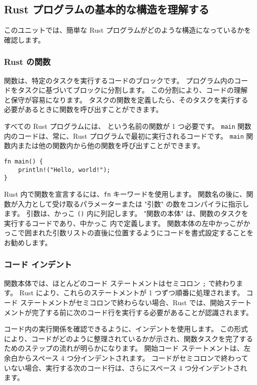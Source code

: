 \subsection{Rust プログラムの基本的な構造を理解する}

このユニットでは、簡単な Rust プログラムがどのような構造になっているかを確認します。

\subsubsection{Rust の関数}

関数は、特定のタスクを実行するコードのブロックです。 プログラム内のコードをタスクに基づいてブロックに分割します。 この分割により、コードの理解と保守が容易になります。 タスクの関数を定義したら、そのタスクを実行する必要があるときに関数を呼び出すことができます。

すべての Rust プログラムには、 という名前の関数が 1 つ必要です。 \texttt{main} 関数内のコードは、常に、Rust プログラムで最初に実行されるコードです。 \texttt{main} 関数内または他の関数内から他の関数を呼び出すことができます。



\begin{lstlisting}[numbers=none]
fn main() {
    println!("Hello, world!");
}
\end{lstlisting}

Rust 内で関数を宣言するには、\texttt{fn} キーワードを使用します。 関数名の後に、関数が入力として受け取るパラメーターまたは "引数" の数をコンパイラに指示します。 引数は、かっこ \texttt{()} 内に列記します。 "関数の本体" は、関数のタスクを実行するコードであり、中かっこ 内で定義します。 関数本体の左中かっこがかっこで囲まれた引数リストの直後に位置するようにコードを書式設定することをお勧めします。

\subsubsection{コード インデント}

関数本体では、ほとんどのコード ステートメントはセミコロン \texttt{;} で終わります。 Rust により、これらのステートメントが 1 つずつ順番に処理されます。 コード ステートメントがセミコロンで終わらない場合、Rust では、開始ステートメントが完了する前に次のコード行を実行する必要があることが認識されます。

コード内の実行関係を確認できるように、インデントを使用します。 この形式により、コードがどのように整理されているかが示され、関数タスクを完了するためのステップの流れが明らかになります。 開始コード ステートメントは、左余白からスペース 4 つ分インデントされます。 コードがセミコロンで終わっていない場合、実行する次のコード行は、さらにスペース 4 つ分インデントされます。

